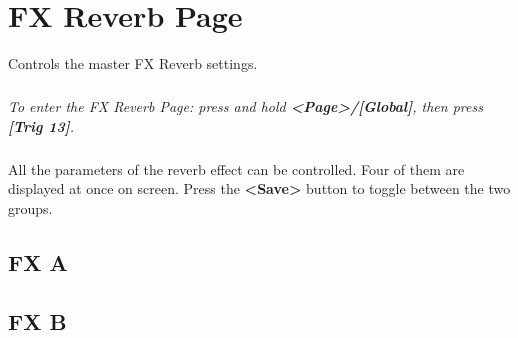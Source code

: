 \chapter{FX Reverb Page}
Controls the master FX Reverb settings.\\
\vspace{-16pt}
\vspace{-32pt}
\paragraph{}\textit{To enter the FX Reverb Page: press and hold \textbf{<Page>/[Global]}, then press \textbf{[Trig 13]}.}
\vspace{-16pt}
\paragraph{}
All the parameters of the reverb effect can be controlled. Four of them are displayed at once on screen. Press the \textbf{<Save>} button to toggle between the two groups.

\vspace{-4pt}
\section{FX A}
\vspace{-16pt}
\vspace{-25pt}
\vspace{-10pt}
\section{FX B}
\vspace{-16pt}
\vspace{-25pt}
\begin{figure}[h!]
\end{figure}
